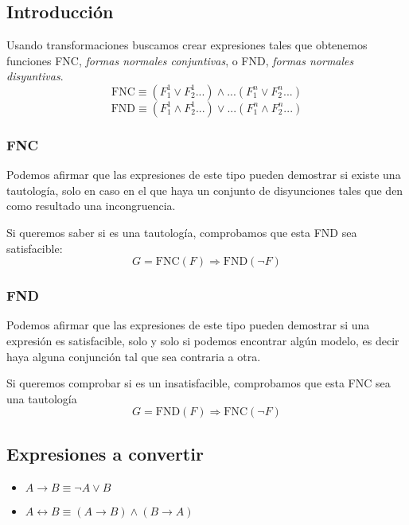 \subsection{Introducción}
\noindent Usando transformaciones buscamos crear expresiones tales que obtenemos funciones FNC, \textit{formas normales conjuntivas}, o FND, \textit{formas normales disyuntivas}.
\[
        \text{FNC} \equiv (F^1_1 \lor F^1_2 ...) \land ... (F^n_1 \lor F^n_2 ...)
\]
\[
        \text{FND} \equiv (F^1_1 \land F^1_2 ...) \lor ... (F^n_1 \land F^n_2 ...)
\]
\subsubsection{FNC}
\noindent Podemos afirmar que las expresiones de este tipo pueden demostrar si existe una tautología, solo en caso en el que haya un conjunto de disyunciones tales que den como resultado una incongruencia.
\par \noindent Si queremos saber si es una tautología, comprobamos que esta FND sea satisfacible:
\[
        \boxed{G = \text{FNC}(F) \Rightarrow \text{FND}(\neg F)}
\]
\subsubsection{FND}
\noindent Podemos afirmar que las expresiones de este tipo pueden demostrar si una expresión es satisfacible, solo y solo si podemos encontrar algún modelo, es decir haya alguna conjunción tal que sea contraria a otra.
\par \noindent Si queremos comprobar si es un insatisfacible, comprobamos que esta FNC sea una tautología
\[
        \boxed{G = \text{FND}(F) \Rightarrow \text{FNC}(\neg F)}
\]
\subsection{Expresiones a convertir}
\begin{itemize}
        \item \(A \rightarrow B \equiv \neg A\lor B\)
        \item \(A \leftrightarrow B \equiv (A \rightarrow B) \land (B \rightarrow A)\)
\end{itemize}